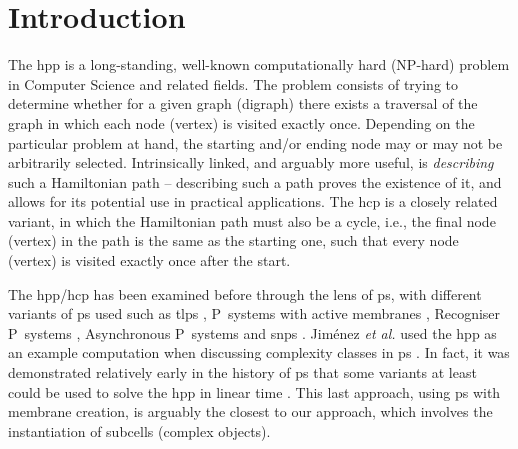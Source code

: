 \section{Introduction}


The \gls{hpp} is a long-standing, well-known computationally hard (NP-hard) problem in Computer Science and related fields.  The problem consists of trying to determine whether for a given graph (digraph) there exists a traversal of the graph in which each node (vertex) is visited exactly once.  Depending on the particular problem at hand, the starting and/or ending node may or may not be arbitrarily selected.  Intrinsically linked, and arguably more useful, is \textit{describing} such a Hamiltonian path -- describing such a path proves the existence of it, and allows for its potential use in practical applications.  The \gls{hcp} is a closely related variant, in which the Hamiltonian path must also be a cycle, i.e., the final node (vertex) in the path is the same as the starting one, such that every node (vertex) is visited exactly once after the start.

The \gls{hpp}/\gls{hcp} has been examined before through the lens of \gls{ps}, with different variants of \gls{ps} used such as \gls{tlps} \cite{Martin-Vide2003}, P~systems with active membranes \cite{Pan2006,Song2013}, Recogniser P~systems \cite{Chen2009}, Asynchronous P~systems \cite{Tagawa2012} and \gls{snps} \cite{Xue2013}.  Jim\'enez \textit{et al.} used the \gls{hpp} as an example computation when discussing complexity classes in \gls{ps} \cite{Jimenez2003}.  In fact, it was demonstrated relatively early in the history of \gls{ps} that some variants at least could be used to solve the \gls{hpp} in linear time \cite{Mutyam2001}.  This last approach, using \gls{ps} with membrane creation, is arguably the closest to our approach, which involves the instantiation of subcells (complex objects).

